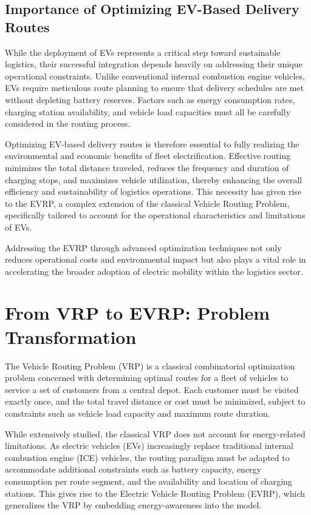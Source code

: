 \subsection{Importance of Optimizing EV-Based Delivery Routes}

While the deployment of EVs represents a critical step toward sustainable logistics, their successful integration depends heavily on addressing their unique operational constraints.  
Unlike conventional internal combustion engine vehicles, EVs require meticulous route planning to ensure that delivery schedules are met without depleting battery reserves.  
Factors such as energy consumption rates, charging station availability, and vehicle load capacities must all be carefully considered in the routing process.

Optimizing EV-based delivery routes is therefore essential to fully realizing the environmental and economic benefits of fleet electrification.  
Effective routing minimizes the total distance traveled, reduces the frequency and duration of charging stops, and maximizes vehicle utilization, thereby enhancing the overall efficiency and sustainability of logistics operations.  
This necessity has given rise to the EVRP, a complex extension of the classical Vehicle Routing Problem, specifically tailored to account for the operational characteristics and limitations of EVs.

Addressing the EVRP through advanced optimization techniques not only reduces operational costs and environmental impact but also plays a vital role in accelerating the broader adoption of electric mobility within the logistics sector.



\section{From VRP to EVRP: Problem Transformation}

The Vehicle Routing Problem (VRP) is a classical combinatorial optimization problem concerned with determining optimal routes for a fleet of vehicles to service a set of customers from a central depot.  
Each customer must be visited exactly once, and the total travel distance or cost must be minimized, subject to constraints such as vehicle load capacity and maximum route duration.

While extensively studied, the classical VRP does not account for energy-related limitations.  
As electric vehicles (EVs) increasingly replace traditional internal combustion engine (ICE) vehicles, the routing paradigm must be adapted to accommodate additional constraints such as battery capacity, energy consumption per route segment, and the availability and location of charging stations.  
This gives rise to the Electric Vehicle Routing Problem (EVRP), which generalizes the VRP by embedding energy-awareness into the model.

